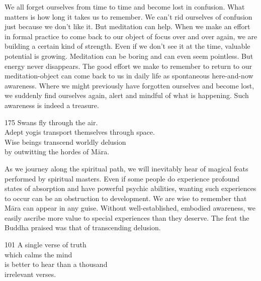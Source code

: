 \begin{dhpRefl}
We all forget ourselves from time to time and become lost in confusion. What matters is how long it takes us to remember. We can't rid ourselves of confusion just because we don't like it. But meditation can help. When we make an effort in formal practice to come back to our object of focus over and over again, we are building a certain kind of strength. Even if we don't see it at the time, valuable potential is growing. Meditation can be boring and can even seem pointless. But energy never disappears. The good effort we make to remember to return to our meditation-object can come back to us in daily life as spontaneous here-and-now awareness. Where we might previously have forgotten ourselves and become lost, we suddenly find ourselves again, alert and mindful of what is happening. Such awareness is indeed a treasure.
\end{dhpRefl}


\begin{dhpVerse}{175}
\label{dhp-175}
Swans fly through the air.\\
Adept yogis transport themselves through space.\\
Wise beings transcend worldly delusion\\
by outwitting the hordes of Māra.
\end{dhpVerse}

\begin{dhpRefl}
As we journey along the spiritual path, we will inevitably hear of magical feats performed by spiritual masters. Even if some people do experience profound states of absorption and have powerful psychic abilities, wanting such experiences to occur can be an obstruction to development. We are wise to remember that Māra can appear in any guise. Without well-established, embodied awareness, we easily ascribe more value to special experiences than they deserve. The feat the Buddha praised was that of transcending delusion.
\end{dhpRefl}


\begin{dhpVerse}{101}
\label{dhp-101}
A single verse of truth\\
which calms the mind\\
is better to hear than a thousand\\
irrelevant verses.
\end{dhpVerse}

